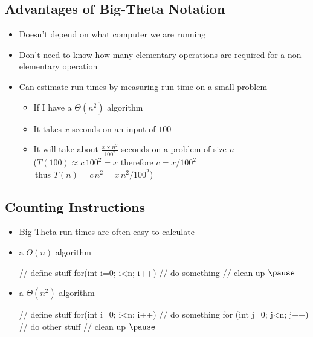 \begin{slide}
\section{Advantages of Big-Theta Notation}

\begin{PauseHighLight}
  \begin{itemize}
  \item Doesn't depend on what computer we are running\pause
  \item Don't need to know how many elementary operations are required for
    a non-elementary operation\pause
\item Can estimate run times by measuring run time on a small problem
  \begin{itemize}
  \item If I have a $\Theta(n^2)$ algorithm
  \item It takes $x$ seconds on an input of $100$
  \item It will take about $\frac{x\times n^2}{100^2}$ seconds on a
    problem of size $n$\pause\\
    ($T(100) \approx c\,100^2 = x$ therefore $c = x/100^2$\\
    \,thus $T(n) = c\,n^2 = x\,n^2/100^2$) 
  \end{itemize}\pause
\end{itemize}
\end{PauseHighLight}

\end{slide}




\begin{slide}
\section{Counting Instructions}

\vspace{-1cm}
\begin{PauseHighLight}
  \begin{itemize}
\item Big-Theta run times are often easy to calculate\pause
\item a $\Theta(n)$ algorithm
\begin{java}
// define stuff
for(int i=0; i<n; i++)  {
  // do something
}
// clean up $\pause$
\end{java}\vspace*{-1cm}
\item a $\Theta(n^2)$ algorithm
\begin{java}
// define stuff
for(int i=0; i<n; i++)  {
  // do something
  for (int j=0; j<n; j++) {
    // do other stuff
  }
}
// clean up $\pause$
\end{java}\vspace*{-1cm}
\end{itemize}
\end{PauseHighLight}

\vspace{-1cm}
\end{slide}

